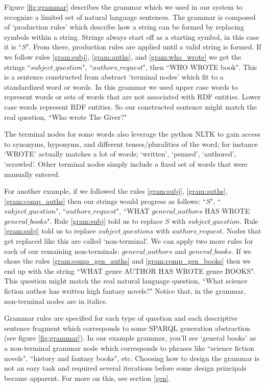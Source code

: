 \documentclass[11pt]{article}
\begin{document}
Figure \ref{fig:grammar} describes the grammar which we used in our system to recognize
a limited set of natural language sentences. The grammar is composed of `production
rules' which describe how a string can be formed by replacing symbols within a
string. Strings always start off as a starting symbol, in this case it is ``$S$". From 
there, production rules are applied until a valid string is formed. If we follow rules 
\ref{gram:subj}, \ref{gram:auths}, and \ref{gram:who_wrote} we get the strings 
``$subject\_question$", ``$authors\_request$", then ``WHO WROTE book". This is a sentence
constructed from abstract `terminal nodes' which fit to a standardized word or words.
In this grammar we used upper case words to represent words or sets of words that are 
not associated with RDF entities. Lower case words represent RDF entities. 
So our constructed sentence might match the real question, ``Who wrote The Giver?"

The terminal nodes for some words also leverage the python NLTK\cite{nltk} to gain access 
to synonyms, hyponyms, and different tenses/pluralities of the word; 
for instance `WROTE' actually matches a lot of words; 
`written', `penned', `authored', `scrawled'. Other terminal nodes
simply include a fixed set of words that were manually entered.

For another example, if we followed the rules \ref{gram:subj}, \ref{gram:auths}, 
\ref{gram:comp_auths} then our strings would progress as follows: 
``$S$", ``$subject\_question$", ``$authors\_request$", 
``WHAT $general\_authors$ HAS WROTE $general\_books$". Rule \ref{gram:subj} told us to 
replace $S$ with $subject\_question$. Rule \ref{gram:subj} told us to replace
$subject\_questions$ with $authors\_request$. Nodes that get replaced like this
are called `non-terminal'. We can apply two more rules for each of our remaining
non-terminals: $general\_authors$ and $general\_books$. If we chose the rules
\ref{gram:comp_gen_auths} and \ref{gram:comp_gen_books} then we end up with the
string ``WHAT genre AUTHOR HAS WROTE genre BOOKS". This question might match the
real natural language question, ``What science fiction author has written 
high fantasy novels?" Notice that, in the grammar, non-terminal nodes are
in italics.

Grammar rules are specified for each type of question and each descriptive sentence
fragment which corresponds to some SPARQL generation abstraction (see 
figure \ref{fig:grammar}). In our example grammar, you'll see `general books' as a
non-terminal grammar node which corresponds to phrases like ``science fiction novels",
``history and fantasy books", etc. Choosing how to design the grammar is not an
easy task and required several iterations before some design principals became apparent.
For more on this, see section \ref{gen}. 
\end{document}
